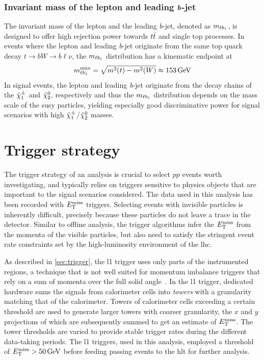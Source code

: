 \subsubsection[Invariant mass of the lepton and leading \textit{b}-jet]{Invariant mass of the lepton and leading $\makemebold{b}$-jet}

The invariant mass of the lepton and the leading \textit{b}-jet, denoted as $m_{\ell b_{1}}$, is designed to offer high rejection power towards $t\bar{t}$ and single top processes. In events where the lepton and leading \textit{b}-jet originate from the same top quark decay $t\rightarrow bW \rightarrow b\ell\nu$, the $m_{\ell b_{1}}$ distribution has a kinematic endpoint at 
\begin{equation}
	\mlb^\mathrm{max} = \sqrt{m^2(t)-m^2(W)} \approx \SI{153}{\GeV} 
\end{equation}
In signal events, the lepton and leading \textit{b}-jet originate from the decay chains of the $\tilde{\chi}_1^\pm$ and $\tilde{\chi}_2^0$, respectively and thus the $m_{\ell b_{1}}$ distribution depends on the mass scale of the \gls{susy} particles, yielding especially good discriminative power for signal scenarios with high $\tilde{\chi}_1^\pm$/$\tilde{\chi}_2^0$ masses.

\section{Trigger strategy}\label{sec:trigger_strategy}

The trigger strategy of an analysis is crucial to select $pp$ events worth investigating, and typically relies on triggers sensitive to physics objects that are important to the signal scenarios considered. The data used in this analysis has been recorded with $E_{\textrm{T}}^{\textrm{miss}}$ triggers.
Selecting events with invisible particles is inherently difficult, precisely because these particles do not leave a trace in the detector.
Similar to offline analysis, the trigger algorithms infer the $E_{\textrm{T}}^{\textrm{miss}}$ from the momenta of the visible particles, but also need to satisfy the stringent event rate constraints set by the high-luminosity environment of the \gls{lhc}.

As described in \cref{sec:trigger}, the \gls{l1} trigger uses only parts of the instrumented regions, a technique that is not well suited for momentum imbalance triggers that rely on a sum of momenta over the full solid angle~\cite{Aad:2020les}.
In the \gls{l1} trigger, dedicated hardware sums the signals from calorimeter cells into \textit{towers} with a granularity matching that of the calorimeter.
Towers of calorimeter cells exceeding a certain threshold are used to generate larger towers with coarser granularity, the $x$ and $y$ projections of which are subsequently summed to get an estimate of $E_{\textrm{T}}^{\textrm{miss}}$. The tower thresholds are varied to provide stable trigger rates during the different data-taking periods.
The \gls{l1} triggers, used in this analysis, employed a threshold of $\etmiss > \SI{50}{\GeV}$ before feeding passing events to the \gls{hlt} for further analysis. 

